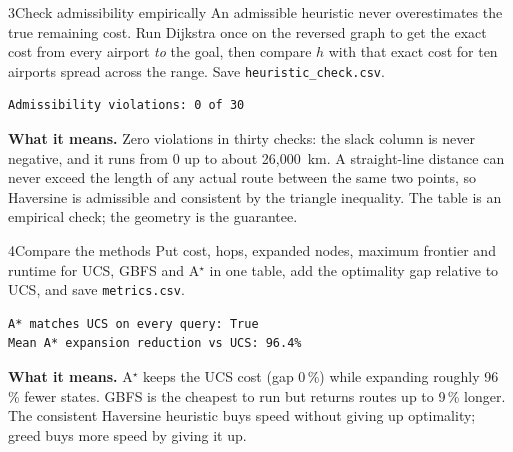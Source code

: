 \begin{labquestion}{3}{Check admissibility empirically}
An admissible heuristic never overestimates the true remaining cost. Run Dijkstra once on the reversed graph to get the exact cost from every airport \emph{to} the goal, then compare $h$ with that exact cost for ten airports spread across the range. Save \texttt{heuristic\_check.csv}.
\end{labquestion}
\begin{labanswer}

\begin{refoutput}
\begin{lstlisting}[style=utpterminal]
Admissibility violations: 0 of 30
\end{lstlisting}
\end{refoutput}

\textbf{What it means.} Zero violations in thirty checks: the slack column is never negative, and it runs from 0 up to about 26,000~km. A straight-line distance can never exceed the length of any actual route between the same two points, so Haversine is admissible and consistent by the triangle inequality. The table is an empirical check; the geometry is the guarantee.
\end{labanswer}

\begin{labquestion}{4}{Compare the methods}
Put cost, hops, expanded nodes, maximum frontier and runtime for UCS, GBFS and A$^\star$ in one table, add the optimality gap relative to UCS, and save \texttt{metrics.csv}.
\end{labquestion}
\begin{labanswer}

\begin{refoutput}
\begin{lstlisting}[style=utpterminal]
A* matches UCS on every query: True
Mean A* expansion reduction vs UCS: 96.4%
\end{lstlisting}
\end{refoutput}

\textbf{What it means.} A$^\star$ keeps the UCS cost (gap 0\,\%) while expanding roughly 96\,\% fewer states. GBFS is the cheapest to run but returns routes up to 9\,\% longer. The consistent Haversine heuristic buys speed without giving up optimality; greed buys more speed by giving it up.
\end{labanswer}

